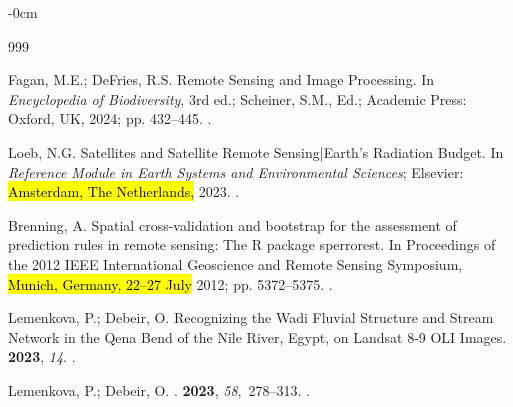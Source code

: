 \documentclass[coasts,article,accept,pdftex,oneauthor]{Definitions/mdpi}
\begin{document}
\begin{adjustwidth}{-\extralength}{0cm}


%





\begin{thebibliography}{999}

Fagan, M.E.; DeFries, R.S.
\newblock Remote Sensing and Image Processing. In {\em Encyclopedia of
  Biodiversity}, 3rd  ed.;  Scheiner, S.M., Ed.;
  Academic Press: Oxford, UK, 2024; pp. 432--445.
.

Loeb, N.G.
\newblock Satellites and Satellite Remote Sensing|Earth's Radiation Budget.
  In {\em Reference Module in Earth Systems and Environmental Sciences};
  Elsevier:  \hl{Amsterdam, The Netherlands,} %
  2023.
.

Brenning, A.
\newblock Spatial cross-validation and bootstrap for the assessment of
  prediction rules in remote sensing: The R package sperrorest.
\newblock In Proceedings of the 2012 IEEE International Geoscience and Remote
  Sensing Symposium, \hl{Munich, Germany, 22--27 July} 2012; pp. 5372--5375.
.

Lemenkova, P.; Debeir, O.
\newblock Recognizing the Wadi Fluvial Structure and Stream Network in the Qena
  Bend of the Nile River, Egypt, on Landsat 8-9 OLI Images.
 {\bf 2023}, {\em 14}.
.

Lemenkova, P.; Debeir, O.
.
 {\bf 2023}, {\em 58},~278--313.
.


\end{thebibliography}
\end{adjustwidth}
\end{document}
